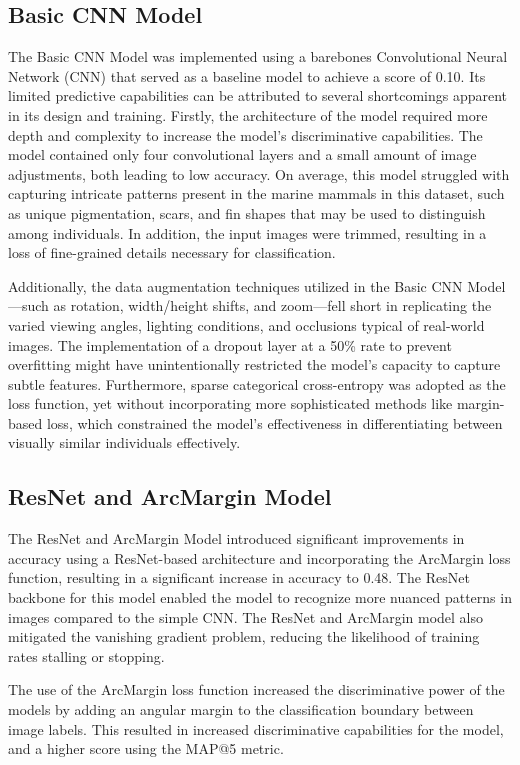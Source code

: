 \documentclass[twocolumn]{article}
\begin{document}
\subsection{Basic CNN Model}
The Basic CNN Model was implemented using a barebones Convolutional Neural Network (CNN) that served as a baseline model to achieve a score of 0.10. Its limited predictive capabilities can be attributed to several shortcomings apparent in its design and training. Firstly, the architecture of the model required more depth and complexity to increase the model’s discriminative capabilities. The model contained only four convolutional layers and a small amount of image adjustments, both leading to low accuracy. On average, this model struggled with capturing intricate patterns present in the marine mammals in this dataset, such as unique pigmentation, scars, and fin shapes that may be used to distinguish among individuals. In addition, the input images were trimmed, resulting in a loss of fine-grained details necessary for classification. 

Additionally, the data augmentation techniques utilized in the Basic CNN Model—such as rotation, width/height shifts, and zoom—fell short in replicating the varied viewing angles, lighting conditions, and occlusions typical of real-world images. The implementation of a dropout layer at a 50\% rate to prevent overfitting might have unintentionally restricted the model’s capacity to capture subtle features. Furthermore, sparse categorical cross-entropy was adopted as the loss function, yet without incorporating more sophisticated methods like margin-based loss, which constrained the model’s effectiveness in differentiating between visually similar individuals effectively.

\subsection{ResNet and ArcMargin Model}

The ResNet and ArcMargin Model introduced significant improvements in accuracy using a ResNet-based architecture and incorporating the ArcMargin loss function, resulting in a significant increase in accuracy to 0.48. The ResNet backbone for this model enabled the model to recognize more nuanced patterns in images compared to the simple CNN. The ResNet and ArcMargin model also mitigated the vanishing gradient problem, reducing the likelihood of training rates stalling or stopping.

The use of the ArcMargin loss function increased the discriminative power of the models by adding an angular margin to the classification boundary between image labels. This resulted in increased discriminative capabilities for the model, and a higher score using the MAP@5 metric.
\end{document}
